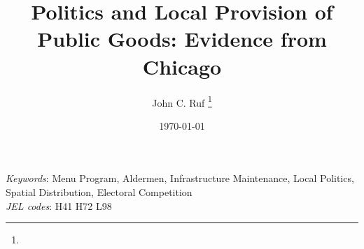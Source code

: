 \documentclass[11pt]{article}
\title{Politics and Local Provision of Public Goods: Evidence from Chicago}
\author{John C. Ruf \thanks{\rufemail}}
\date{\today}
\renewcommand{\=}[1]{\stackrel{#1}{=}} %
\theoremstyle{definition}
\begin{document}

\maketitle

\begin{abstract}

\end{abstract}
\vspace{1cm}
{\small
\noindent \textit{Keywords}: Menu Program, Aldermen, Infrastructure Maintenance, Local Politics, Spatial Distribution, Electoral Competition  \\
\textit{JEL codes}: H41 H72 L98 
}
\thispagestyle{empty}
\newpage
\setcounter{page}{1}


%
%
%
%








{}

\newpage
\clearpage


% 
%
%
\end{document}
